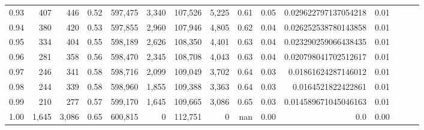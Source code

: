 \begin{tabular}{rrrrrrrrrrrrrrr}
0.93 &     407 &    446 &  0.52 &  597,475 &    3,340 &  107,526 &    5,225 &  0.61 &  0.05 &  0.029622797137054218 &      0.01 \\
0.94 &     380 &    420 &  0.53 &  597,855 &    2,960 &  107,946 &    4,805 &  0.62 &  0.04 &  0.026252538780143858 &      0.01 \\
0.95 &     334 &    404 &  0.55 &  598,189 &    2,626 &  108,350 &    4,401 &  0.63 &  0.04 &  0.023290259066438435 &      0.01 \\
0.96 &     281 &    358 &  0.56 &  598,470 &    2,345 &  108,708 &    4,043 &  0.63 &  0.04 &  0.020798041702512617 &      0.01 \\
0.97 &     246 &    341 &  0.58 &  598,716 &    2,099 &  109,049 &    3,702 &  0.64 &  0.03 &   0.01861624287146012 &      0.01 \\
0.98 &     244 &    339 &  0.58 &  598,960 &    1,855 &  109,388 &    3,363 &  0.64 &  0.03 &    0.0164521822422861 &      0.01 \\
0.99 &     210 &    277 &  0.57 &  599,170 &    1,645 &  109,665 &    3,086 &  0.65 &  0.03 &  0.014589671045046163 &      0.01 \\
1.00 &   1,645 &  3,086 &  0.65 &  600,815 &        0 &  112,751 &        0 &   nan &  0.00 &                   0.0 &      0.00 \\
\bottomrule
\end{tabular}
